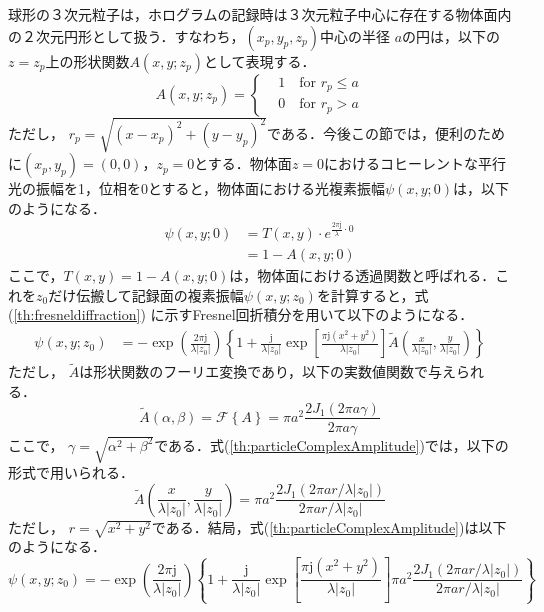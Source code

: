 球形の３次元粒子は，ホログラムの記録時は３次元粒子中心に存在する物体面内の２次元円形として扱う．すなわち，$(x_p,y_p,z_p)$中心の半径 $a$の円は，以下の $z=z_p$上の形状関数$A(x,y;z_p)$として表現する．
\begin{equation}
    \label{th:particleShapeFunction}
    A(x,y;z_p) = \left\{
    \begin{aligned}
        &1 \quad \text{for } r_p \leq a \\
        &0 \quad \text{for } r_p > a
    \end{aligned}
    \right.
\end{equation}
ただし， $r_p=\sqrt{(x-x_p)^2+(y-y_p)^2}$である．今後この節では，便利のために$(x_p,y_p) = (0,0)$，$z_p = 0$とする．物体面$z=0$におけるコヒーレントな平行光の振幅を1，位相を0とすると，物体面における光複素振幅$\psi(x,y;0)$は，以下のようになる．
\begin{align}
    \psi(x,y;0) &= T(x,y)\cdot e^{\frac{2\pi \mathrm{j}}{\lambda}\cdot 0} \\
    &= 1 - A(x,y;0)
\end{align}
ここで，$T(x,y) = 1 - A(x,y;0)$は，物体面における透過関数と呼ばれる．これを$z_0$だけ伝搬して記録面の複素振幅$\psi(x,y;z_0)$を計算すると，式(\ref{th:fresneldiffraction}) に示すFresnel回折積分を用いて以下のようになる\cite{vikram}．
\begin{align}
    \label{th:particleComplexAmplitude}
    \psi(x,y;z_0) &= -\exp{\left( \frac{2\pi \mathrm{j}}{\lambda |z_0|} \right)} \left\{  
        1 + \frac{\mathrm{j}}{\lambda |z_0|} \exp{\left[ \frac{\pi \mathrm{j} \left( x^2+y^2 \right)}{\lambda |z_0|}\right] \tilde{A}\left( \frac{x}{\lambda |z_0|}, \frac{y}{\lambda |z_0|} \right) }
     \right\}
\end{align}
ただし， $\tilde{A}$は形状関数のフーリエ変換であり，以下の実数値関数で与えられる．
\begin{equation}
    \label{th:fourierOfA}
    \tilde{A}(\alpha,\beta) = \mathcal{F}\left\{ A \right\} = \pi a^2 \frac{2J_1(2\pi a \gamma)}{2\pi a \gamma}
\end{equation}
ここで， $\gamma = \sqrt{\alpha^2+\beta^2}$である．式(\ref{th:particleComplexAmplitude})では，以下の形式で用いられる．
\begin{equation}
    \label{th:fourierOfA2}
    \tilde{A}\left( \frac{x}{\lambda |z_0|}, \frac{y}{\lambda |z_0|} \right)  =  \pi a^2 \frac{2J_1(2\pi a r/ \lambda |z_0|)}{2\pi a r/ \lambda |z_0|}
\end{equation}
ただし， $r=\sqrt{x^2+y^2}$である．結局，式(\ref{th:particleComplexAmplitude})は以下のようになる．
\begin{equation}
    \label{th:particleComplexAmplitude2}
    \psi(x,y;z_0) = -\exp{\left( \frac{2\pi \mathrm{j}}{\lambda |z_0|} \right)} \left\{  
        1 + \frac{\mathrm{j}}{\lambda |z_0|} \exp{\left[ \frac{\pi \mathrm{j} \left( x^2+y^2 \right)}{\lambda |z_0|}\right] \pi a^2 \frac{2J_1(2\pi a r/ \lambda |z_0|)}{2\pi a r/ \lambda |z_0|} }
     \right\}
\end{equation}


